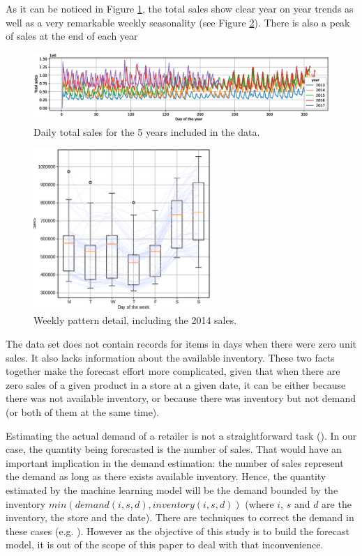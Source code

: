 \documentclass{elsarticle}
\begin{document}
	 As it can be noticed in Figure \ref{fig:timeseries}, the total sales show clear year on year trends as well as a very remarkable weekly seasonality (see Figure \ref{fig:timeseries_detail}). There is also a peak of sales at the end of each year
	 
	 	\begin{figure}
	 	\centering
	 	\includegraphics[width=1\textwidth]{img/timeseries}
	 	\caption{Daily total sales for the 5 years included in the data.}
	 	\label{fig:timeseries}
	 \end{figure}
	
	\begin{figure}
		\centering
		\includegraphics[width=0.6\textwidth]{img/timeseries_dow}
		\caption{Weekly pattern detail, including the 2014 sales.}
		\label{fig:timeseries_detail}
	\end{figure}

	The data set does not contain records for items in days when there were zero unit sales. It also lacks information about the available inventory. These two facts together make the forecast effort more complicated, given that when there are zero sales of a given product in a store at a given date, it can be either because there was not available inventory, or because there was inventory but not demand (or both of them at the same time).
	
	Estimating the actual demand of a retailer is not a straightforward task (\cite{Deep2019}). In our case, the quantity being forecasted is the number of sales. That would have an important implication in the demand estimation: the number of sales represent the demand as long as there exists available inventory. Hence, the quantity estimated by the machine learning model will be the demand bounded by the inventory $min(demand(i,s,d), inventory(i,s,d))$ (where $i$, $s$ and $d$ are the inventory, the store and the date). There are techniques to correct the demand in these cases (e.g. \cite{Bell2000}). However as the objective of this study is to build the forecast model, it is out of the scope of this paper to deal with that inconvenience.
	
\end{document}
